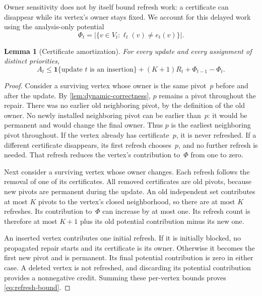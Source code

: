 \documentclass[11pt,letterpaper]{article}
\newtheorem{lemma}[theorem]{Lemma}
\theoremstyle{definition}
\theoremstyle{remark}
\newcommand{\1}{\mathbf{1}}
\begin{document}
Owner sensitivity does not by itself bound refresh work: a certificate can disappear while its vertex's owner stays fixed.  We account for this delayed work using the analysis-only potential
\begin{equation}\label{eq:dynamic-potential}
 \Phi_t=\bigl|\{v\in V_t:\ell_t(v)\ne e_t(v)\}\bigr|.
\end{equation}

\begin{lemma}[Certificate amortization]\label{lem:certificate-amortization}
For every update and every assignment of distinct priorities,
\begin{equation}\label{eq:refresh-bound}
 A_t\le\1\{\text{update $t$ is an insertion}\}
       +(K+1)R_t+\Phi_{t-1}-\Phi_t.
\end{equation}
\end{lemma}

\begin{proof}
Consider a surviving vertex whose owner is the same pivot~$p$ before and after the update.  By \cref{lem:dynamic-correctness}, $p$ remains a pivot throughout the repair.  There was no earlier old neighboring pivot, by the definition of the old owner.  No newly installed neighboring pivot can be earlier than~$p$: it would be permanent and would change the final owner.  Thus $p$ is the earliest neighboring pivot throughout.  If the vertex already has certificate~$p$, it is never refreshed.  If a different certificate disappears, its first refresh chooses~$p$, and no further refresh is needed.  That refresh reduces the vertex's contribution to~$\Phi$ from one to zero.

Next consider a surviving vertex whose owner changes.  Each refresh follows the removal of one of its certificates.  All removed certificates are old pivots, because new pivots are permanent during the update.  An old independent set contributes at most $K$ pivots to the vertex's closed neighborhood, so there are at most $K$ refreshes.  Its contribution to~$\Phi$ can increase by at most one.  Its refresh count is therefore at most $K+1$ plus its old potential contribution minus its new one.

An inserted vertex contributes one initial refresh.  If it is initially blocked, no propagated repair starts and its certificate is its owner.  Otherwise it becomes the first new pivot and is permanent.  Its final potential contribution is zero in either case.  A deleted vertex is not refreshed, and discarding its potential contribution provides a nonnegative credit.  Summing these per-vertex bounds proves \cref{eq:refresh-bound}.
\end{proof}
\end{document}
